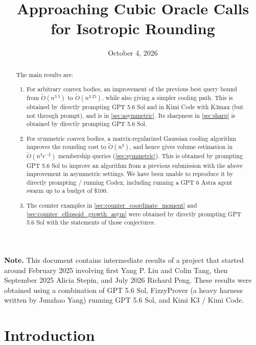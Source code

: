\documentclass[11pt]{article}
\numberwithin{equation}{section}
\theoremstyle{definition}
\renewcommand{\tilde}{\widetilde}
\begin{document}
\title{Approaching Cubic Oracle Calls for Isotropic Rounding}
\author{}
\date{October 4, 2026}


\clearpage\maketitle

\begin{abstract}
The main results are:
\begin{enumerate}
\item For arbitrary convex bodies, an improvement of the previous best query
  bound from $\tilde{O}(n^{3.5})$ to $\tilde{O}(n^{3.25})$,
  while also giving a simpler cooling path.
  This is obtained by directly prompting GPT 5.6 Sol
  and in Kimi Code with K3max (but not through prompt),
  and is in \cref{sec:asymmetric}.
  Its sharpness in \cref{sec:sharp} is obtained
  by directly prompting GPT 5.6 Sol.
\item For symmetric convex bodies, a matrix-regularized Gaussian cooling
  algorithm improves the rounding cost to $\tilde{O}(n^3)$, and hence gives
  volume estimation in $\tilde{O}(n^3\epsilon^{-2})$ membership queries
  (\cref{sec:symmetric}).
  This is obtained by prompting GPT 5.6 Sol to improve an algorithm from a
  previous submission with the above improvement in asymmetric settings.
  We have been unable to reproduce it by directly prompting / running Codex,
  including running a GPT 6 Astra agent swarm up to a budget of \$100.
\item The counter examples in \cref{sec:counter_coordinate_moment}
and \cref{sec:counter_ellipsoid_growth_asym} were obtained by directly
prompting GPT 5.6 Sol with the statements of those conjectures.
\end{enumerate}

\end{abstract}

\noindent\textbf{Note.}
This document contains intermediate results of a project that started
around February 2025
involving first Yang P. Liu and Colin Tang,
then September 2025 Alicia Stepin, and July 2026 Richard Peng.
These results were obtained using a combination of GPT 5.6 Sol,
FizzyProver (a heavy harness written by Junzhao Yang) running GPT 5.6 Sol,
and Kimi K3 / Kimi Code.

\newpage

\tableofcontents

\newpage

\section{Introduction}
\label{sec:intro}
\end{document}

